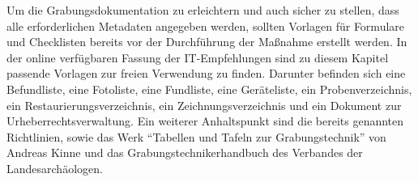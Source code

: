 Um die Grabungsdokumentation zu erleichtern und auch sicher zu stellen, dass alle erforderlichen Metadaten angegeben werden, sollten Vorlagen für Formulare und Checklisten bereits vor der Durchführung der Maßnahme erstellt werden. In der online verfügbaren Fassung der IT-Empfehlungen sind zu diesem Kapitel passende Vorlagen zur freien Verwendung zu finden. Darunter befinden sich eine Befundliste, eine Fotoliste, eine Fundliste, eine Geräteliste, ein Probenverzeichnis, ein Restaurierungsverzeichnis, ein Zeichnungsverzeichnis und ein Dokument zur Urheberrechtsverwaltung. Ein weiterer Anhaltspunkt sind die bereits genannten Richtlinien, sowie das Werk "`Tabellen und Tafeln zur Grabungstechnik"' von Andreas Kinne und das Grabungstechnikerhandbuch des Verbandes der Landesarchäologen. 
